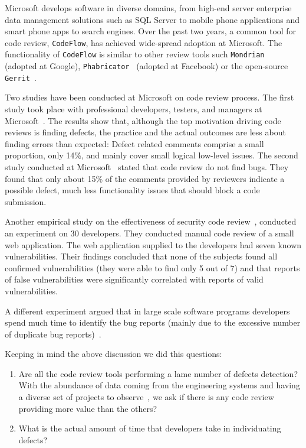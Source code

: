 \documentclass[ifip]{svmult}
\begin{document}
Microsoft develops software in diverse domains, from high-end server enterprise data management solutions such
as SQL Server to mobile phone applications and smart phone apps to search engines. Over the past two years, 
a common tool for code review, \texttt{CodeFlow}, has achieved wide-spread adoption at Microsoft. 
The functionality of \texttt{CodeFlow} is similar to other review tools such \texttt{Mondrian}~ \cite{contribution6} (adopted at Google), \texttt{Phabricator}~\cite{contribution7} (adopted at Facebook) or the open-source \texttt{Gerrit}~\cite{contribution8}.

Two studies have been conducted at Microsoft on code review process. The first study took place with professional developers, testers, and managers at Microsoft~\cite{contribution9}. 
The results show that, although the top motivation driving code reviews is finding defects, the practice and the 
actual outcomes are less about finding errors than expected: Defect related comments comprise a small proportion, only 14\%, 
and mainly cover small logical low-level issues.
The second study conducted at Microsoft~\cite{contribution20} stated that code review do not find bugs. They found that only about 
15\% of the comments provided by reviewers indicate a possible defect, much less functionality issues that should block a 
code submission. 

Another empirical study on the effectiveness of security code review~\cite{contribution1}, conducted an experiment on 30 developers. They 
conducted manual code review of a small web application. The web application supplied to the developers had seven known vulnerabilities. 
Their findings concluded that none of the subjects found all confirmed vulnerabilities (they were able to find only 5 out of 7) 
and that reports of false vulnerabilities were significantly correlated with reports of valid vulnerabilities.

A different experiment argued that in large scale software programs developers spend much time to 
identify the bug reports (mainly due to the excessive number of duplicate bug reports)~\cite{contribution10}.

Keeping in mind the above discussion we did this questions:

\begin{enumerate}
  \item Are all the code review tools performing a lame number of defects detection?
With the abundance of data coming from the engineering systems and having a diverse set of projects to observe~\cite{contribution12, contribution13}, we ask 
if there is any code review providing more value than the others?

  \item What is the actual amount of time that developers take in individuating defects?
\end{enumerate}
\end{document}
